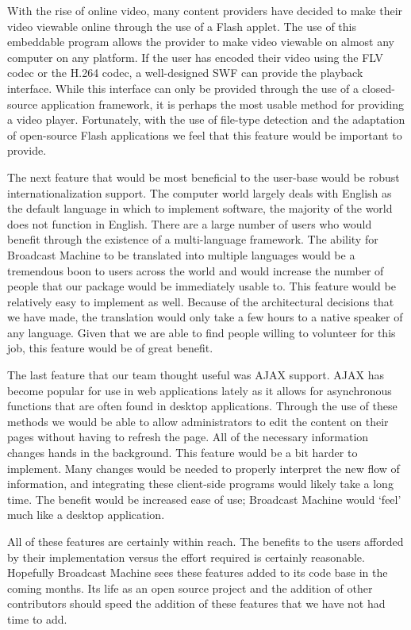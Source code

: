 \documentclass[a4paper,12pt]{report}
\newcommand{\scare}[1]{`#1'}
\begin{document}
With the rise of online video, many content providers have decided to make their video viewable online through the use of a Flash applet.
The use of this embeddable program allows the provider to make video viewable on almost any computer on any platform.
If the user has encoded their video using the FLV codec or the H.264 codec, a well-designed SWF can provide the playback interface.
While this interface can only be provided through the use of a closed-source application framework, it is perhaps the most usable method for providing a video player.
Fortunately, with the use of file-type detection and the adaptation of open-source Flash applications we feel that this feature would be important to provide.

The next feature that would be most beneficial to the user-base would be robust internationalization support.
The computer world largely deals with English as the default language in which to implement software, the majority of the world does not function in English.
There are a large number of users who would benefit through the existence of a multi-language framework.
The ability for Broadcast Machine to be translated into multiple languages would be a tremendous boon to users across the world and would increase the number of people that our package would be immediately usable to.
This feature would be relatively easy to implement as well.
Because of the architectural decisions that we have made, the translation would only take a few hours to a native speaker of any language.
Given that we are able to find people willing to volunteer for this job, this feature would be of great benefit.

The last feature that our team thought useful was AJAX support.
AJAX has become popular for use in web applications lately as it allows for asynchronous functions that are often found in desktop applications.
Through the use of these methods we would be able to allow administrators to edit the content on their pages without having to refresh the page.
All of the necessary information changes hands in the background.
This feature would be a bit harder to implement.
Many changes would be needed to properly interpret the new flow of information, and integrating these client-side programs would likely take a long time.
The benefit would be increased ease of use; Broadcast Machine would \scare{feel} much like a desktop application.

All of these features are certainly within reach.
The benefits to the users afforded by their implementation versus the effort required is certainly reasonable.
Hopefully Broadcast Machine sees these features added to its code base in the coming months.
Its life as an open source project and the addition of other contributors should speed the addition of these features that we have not had time to add.
 
\end{document}
